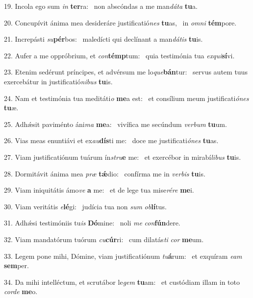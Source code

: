 19. Incola ego sum \textit{in} \textbf{ter}ra: \ast\  non abscóndas a me man\textit{dá}\textit{ta} \textbf{tu}a.\

20. Concupívit ánima mea desideráre justificatió\textit{nes} \textbf{tu}as, \ast\  in \textit{om}\textit{ni} \textbf{tém}pore.\

21. Increpásti \textit{su}\textbf{pér}bos: \ast\  maledícti qui declínant a man\textit{dá}\textit{tis} \textbf{tu}is.\

22. Aufer a me oppróbrium, et \textit{con}\textbf{témp}tum: \ast\  quia testimónia tua \textit{ex}\textit{qui}\textbf{sí}vi.\

23. Etenim sedérunt príncipes, et advérsum me lo\textit{que}\textbf{bán}tur: \ast\  servus autem tuus exercebátur in justificatió\textit{ni}\textit{bus} \textbf{tu}is.\

24. Nam et testimónia tua meditáti\textit{o} \textbf{me}a est: \ast\  et consílium meum justificati\textit{ó}\textit{nes} \textbf{tu}æ.\

25. Adhǽsit paviménto áni\textit{ma} \textbf{me}a: \ast\  vivífica me secúndum \textit{ver}\textit{bum} \textbf{tu}um.\

26. Vias meas enuntiávi et ex\textit{au}\textbf{dís}ti me: \ast\  doce me justificati\textit{ó}\textit{nes} \textbf{tu}as.\

27. Viam justificatiónum tuárum ín\textit{stru}\textbf{e} me: \ast\  et exercébor in mirabí\textit{li}\textit{bus} \textbf{tu}is.\

28. Dormitávit ánima mea \textit{præ} \textbf{tǽ}dio: \ast\  confírma me in \textit{ver}\textit{bis} \textbf{tu}is.\

29. Viam iniquitátis ámo\textit{ve} \textbf{a} me: \ast\  et de lege tua mise\textit{ré}\textit{re} \textbf{me}i.\

30. Viam veritátis \textit{e}\textbf{lé}gi: \ast\  judícia tua non \textit{sum} \textit{ob}\textbf{lí}tus.\

31. Adhǽsi testimóniis tu\textit{is} \textbf{Dó}mine: \ast\  noli \textit{me} \textit{con}\textbf{fún}dere.\

32. Viam mandatórum tuórum \textit{cu}\textbf{cúr}ri: \ast\  cum dilatás\textit{ti} \textit{cor} \textbf{me}um.\

33. Legem pone mihi, Dómine, viam justificatiónum \textit{tu}\textbf{á}rum: \ast\  et exquíram \textit{e}\textit{am} \textbf{sem}per.\

34. Da mihi intelléctum, et scrutábor le\textit{gem} \textbf{tu}am: \ast\  et custódiam illam in toto \textit{cor}\textit{de} \textbf{me}o.\

